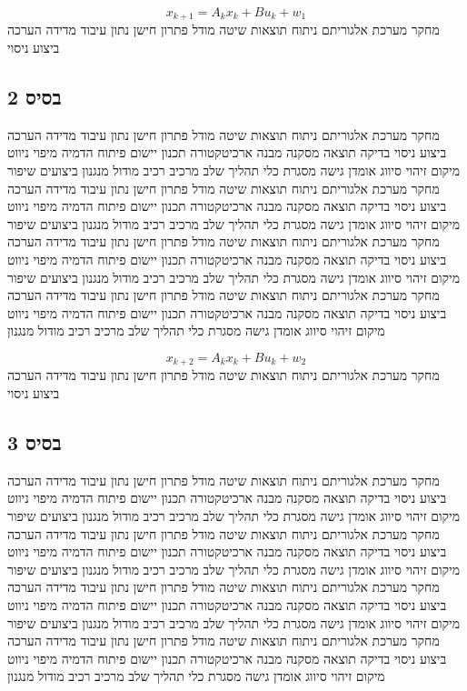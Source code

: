 \begin{equation}
    x_{k+1} = A_{k} x_k + B u_{k} + w_{1}
    \label{eq:ch02_1}
\end{equation}
מחקר מערכת אלגוריתם ניתוח תוצאות שיטה מודל פתרון חישן נתון עיבוד מדידה הערכה ביצוע ניסוי

\subsection{בסיס 2}
\label{sub:ch02_2}
מחקר מערכת אלגוריתם ניתוח תוצאות שיטה מודל פתרון חישן נתון עיבוד מדידה הערכה ביצוע ניסוי בדיקה תוצאה מסקנה מבנה ארכיטקטורה תכנון יישום פיתוח הדמיה מיפוי ניווט מיקום זיהוי סיווג אומדן גישה מסגרת כלי תהליך שלב מרכיב רכיב מודול מנגנון ביצועים שיפור מחקר מערכת אלגוריתם ניתוח תוצאות שיטה מודל פתרון חישן נתון עיבוד מדידה הערכה ביצוע ניסוי בדיקה תוצאה מסקנה מבנה ארכיטקטורה תכנון יישום פיתוח הדמיה מיפוי ניווט מיקום זיהוי סיווג אומדן גישה מסגרת כלי תהליך שלב מרכיב רכיב מודול מנגנון ביצועים שיפור מחקר מערכת אלגוריתם ניתוח תוצאות שיטה מודל פתרון חישן נתון עיבוד מדידה הערכה ביצוע ניסוי בדיקה תוצאה מסקנה מבנה ארכיטקטורה תכנון יישום פיתוח הדמיה מיפוי ניווט מיקום זיהוי סיווג אומדן גישה מסגרת כלי תהליך שלב מרכיב רכיב מודול מנגנון ביצועים שיפור מחקר מערכת אלגוריתם ניתוח תוצאות שיטה מודל פתרון חישן נתון עיבוד מדידה הערכה ביצוע ניסוי בדיקה תוצאה מסקנה מבנה ארכיטקטורה תכנון יישום פיתוח הדמיה מיפוי ניווט מיקום זיהוי סיווג אומדן גישה מסגרת כלי תהליך שלב מרכיב רכיב מודול מנגנון

\begin{equation}
    x_{k+2} = A_{k} x_k + B u_{k} + w_{2}
    \label{eq:ch02_2}
\end{equation}
מחקר מערכת אלגוריתם ניתוח תוצאות שיטה מודל פתרון חישן נתון עיבוד מדידה הערכה ביצוע ניסוי

\subsection{בסיס 3}
\label{sub:ch02_3}
מחקר מערכת אלגוריתם ניתוח תוצאות שיטה מודל פתרון חישן נתון עיבוד מדידה הערכה ביצוע ניסוי בדיקה תוצאה מסקנה מבנה ארכיטקטורה תכנון יישום פיתוח הדמיה מיפוי ניווט מיקום זיהוי סיווג אומדן גישה מסגרת כלי תהליך שלב מרכיב רכיב מודול מנגנון ביצועים שיפור מחקר מערכת אלגוריתם ניתוח תוצאות שיטה מודל פתרון חישן נתון עיבוד מדידה הערכה ביצוע ניסוי בדיקה תוצאה מסקנה מבנה ארכיטקטורה תכנון יישום פיתוח הדמיה מיפוי ניווט מיקום זיהוי סיווג אומדן גישה מסגרת כלי תהליך שלב מרכיב רכיב מודול מנגנון ביצועים שיפור מחקר מערכת אלגוריתם ניתוח תוצאות שיטה מודל פתרון חישן נתון עיבוד מדידה הערכה ביצוע ניסוי בדיקה תוצאה מסקנה מבנה ארכיטקטורה תכנון יישום פיתוח הדמיה מיפוי ניווט מיקום זיהוי סיווג אומדן גישה מסגרת כלי תהליך שלב מרכיב רכיב מודול מנגנון ביצועים שיפור מחקר מערכת אלגוריתם ניתוח תוצאות שיטה מודל פתרון חישן נתון עיבוד מדידה הערכה ביצוע ניסוי בדיקה תוצאה מסקנה מבנה ארכיטקטורה תכנון יישום פיתוח הדמיה מיפוי ניווט מיקום זיהוי סיווג אומדן גישה מסגרת כלי תהליך שלב מרכיב רכיב מודול מנגנון

